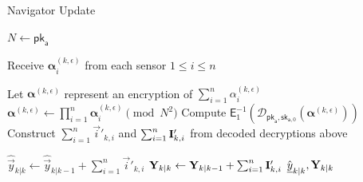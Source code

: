 \begin{algorithm}[htbp]
\caption{Navigator Update}\label{alg:nonlin_fusion:nav_update}
\begin{algorithmic}[1]

    \State $N \gets \mathsf{pk}_{\mathsf{a}}$
    
        \State Receive $\bm{\alpha}_{i}^{(k,\epsilon)}$ from each sensor $1\leq i\leq n$
    \EndFor

    \State Let $\bm{\alpha}^{(k,\epsilon)}$ represent an encryption of $\sum_{i=1}^n\alpha_{i}^{(k,\epsilon)}$
        \State $\bm{\alpha}^{(k,\epsilon)} \gets \prod_{i=1}^n\bm{\alpha}_{i}^{(k,\epsilon)}\pmod{N^2}$
        \State Compute $\mathsf{E}^{-1}_{1}(\mathcal{D}_{\mathsf{pk}_{\mathsf{a}},\mathsf{sk}_{\mathsf{a},0}}(\bm{\alpha}^{(k,\epsilon)}))$
    \EndFor
    \State Construct $\sum_{i=1}^n\vec{i}'_{k,i}$ and $\sum_{i=1}^n{{\mathbf{I}}}'_{k,i}$ from decoded decryptions above

    \State $\hat{\vec{y}}_{k|k} \gets \hat{\vec{y}}_{k|k-1} + \sum_{i=1}^n\vec{i}'_{k,i}$
    \State ${{\mathbf{Y}}}_{k|k} \gets {\ensuremath{{\mathbf{Y}}}}_{k|k-1} + \sum_{i=1}^n{{\mathbf{I}}}'_{k,i}$
    \State \Return $\hat{{\underline{y}}}_{k|k}, {{\mathbf{Y}}}_{k|k}$
    \EndProcedure
\end{algorithmic}
\end{algorithm}

